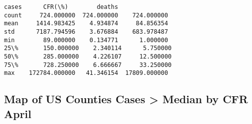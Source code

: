 \documentclass[11pt]{article}
\makeatletter
\newcommand{\boxspacing}{\kern\kvtcb@left@rule\kern\kvtcb@boxsep}
\newcommand{\prompt}[4]{
        \ttfamily\llap{{\color{#2}[#3]:\hspace{3pt}#4}}\vspace{-\baselineskip}
    }
\makeatother
\begin{document}
            \begin{tcolorbox}[breakable, size=fbox, boxrule=.5pt, pad at break*=1mm, opacityfill=0]
\prompt{Out}{outcolor}{23}{\boxspacing}
\begin{Verbatim}[commandchars=\\\{\}]
               cases      CFR(\%)        deaths
count     724.000000  724.000000    724.000000
mean     1414.983425    4.934874     84.856354
std      7187.794596    3.676884    683.978487
min        89.000000    0.134771      1.000000
25\%       150.000000    2.340114      5.750000
50\%       285.000000    4.226107     12.500000
75\%       728.250000    6.666667     33.250000
max    172784.000000   41.346154  17809.000000
\end{Verbatim}
\end{tcolorbox}
        
    \subsection{\texorpdfstring{\textbf{Map of US Counties Cases
\textgreater{} Median by CFR
April}}{Map of US Counties Cases \textgreater{} Median by CFR April}}\label{map-of-us-counties-cases-median-by-cfr-april}
\end{document}
